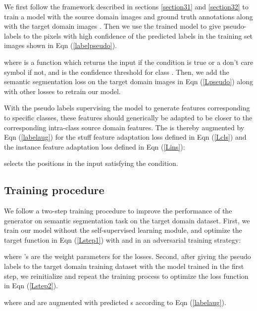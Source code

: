 \documentclass[10pt,twocolumn,letterpaper]{article}
\begin{document}
We first follow the framework described in sections \ref{section31} and \ref{section32} to train a model with the source domain images  and ground truth annotations  along with the target domain images . Then we use the trained model to give pseudo-labels to the pixels with high confidence of the predicted labels in the training set images  shown in Eqn (\ref{labelpseudo}). 
\vspace{-2mm}

where  is a function which returns the input if the condition is true or a don't care symbol if not, and  is the confidence threshold for class . Then, we add the semantic segmentation loss on the target domain images in Eqn (\ref{Lpseudo}) along with other losses to retrain our model.
\vspace{-2mm}

With the pseudo labels supervising the model to generate features corresponding to specific classes, these features should generically be adapted to be closer to the corresponding intra-class source domain features. The  is thereby augmented by Eqn (\ref{labelaug}) for the stuff feature adaptation loss defined in Eqn (\ref{Lcls}) and the instance feature adaptation loss defined in Eqn (\ref{Lins}):
\vspace{-2mm}

 selects the positions in the input satisfying the condition.

\subsection{Training procedure}
We follow a two-step training procedure to improve the performance of the generator  on semantic segmentation task on the target domain dataset. First, we train our model without the self-supervised learning module, and optimize the target function in Eqn (\ref{Lstep1}) with  and  in an adversarial training strategy:
\vspace{-2mm}

where 's are the weight parameters for the losses. Second, after giving the pseudo labels to the target domain training dataset with the model trained in the first step, we reinitialize and repeat the training process to optimize the loss function in Eqn (\ref{Lstep2}).
\vspace{-2mm}

where  and  are augmented with predicted s according to Eqn (\ref{labelaug}).
\end{document}
